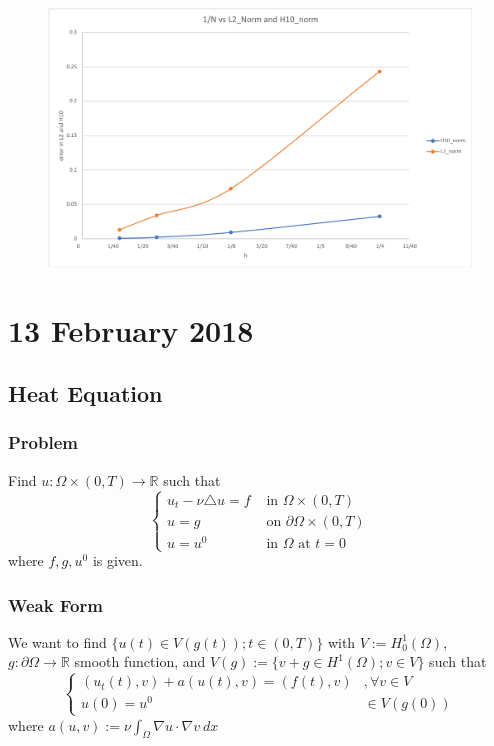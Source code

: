 \documentclass[a4paper,10pt]{article}
\begin{document}
\begin{figure}[h!]
	\centering
	\includegraphics[width=0.7\linewidth]{picture/grafik2}
	\caption{}
	\label{fig:grafik2}
\end{figure}

\section{13 February 2018}
\subsection{Heat Equation}
\subsubsection{Problem}
Find $ u : \Omega \times (0,T) \rightarrow \mathbb{R} $ such that
\[ \begin{cases}
u_{t} - \nu \triangle u = f &\text{ in } \Omega \times (0,T) \\
u = g &\text{ on } \partial\Omega \times (0,T) \\
u = u^{0} &\text{ in } \Omega \text{ at } t=0
\end{cases} \]
where $ f,g,u^{0} $ is given.

\subsubsection{Weak Form}
We want to find $ \{ u(t) \in V(g(t)) ; t \in (0,T)\} $ with $ V := H_{0}^{1}(\Omega) $, $ g : \partial\Omega \rightarrow \mathbb{R} $ smooth function, and $ V(g) := \{ v+g \in H^{1}(\Omega) ; v \in V \} $ such that
\[ \begin{cases}
(u_{t}(t),v) + a(u(t),v) = (f(t),v) &, \forall v \in V \\
u(0) = u^{0} & \in V(g(0))
\end{cases} \]
where $ a(u,v) := \nu \int_{\Omega} \nabla u \cdot \nabla v \ dx $
\end{document}
